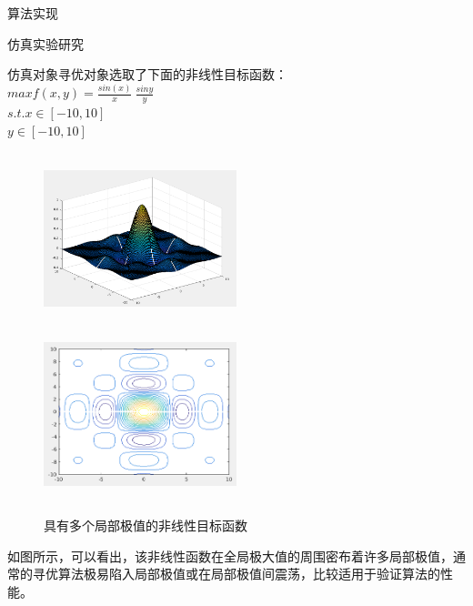 \documentclass[UTF8]{ctexart}
\begin{document}
\begin{section}{算法实现}
\begin{subsection}{仿真实验研究}
\begin{subsubsection}{仿真对象}寻优对象选取了下面的非线性目标函数：\\
	\indent\indent $max f(x,y)=\tfrac {sin(x)}{x}\ \frac{sin{y}}{y}$\\
	\indent\indent $s.t. x\in [-10,10]$\\
	\indent\indent $y\in [-10,10]$\\
	\begin{figure}[htbp]
		\includegraphics[width=0.5\textwidth,height=5cm]{../../pic/fish9.png}
		\includegraphics[width=0.5\textwidth,height=5cm]{../../pic/fish10.png}
		\caption{具有多个局部极值的非线性目标函数}
	\end{figure}
如图所示，可以看出，该非线性函数在全局极大值的周围密布着许多局部极值，通常的寻优算法极易陷入局部极值或在局部极值间震荡，比较适用于验证算法的性能。
\end{subsubsection}


\end{subsection}
\end{section}
\end{document}
